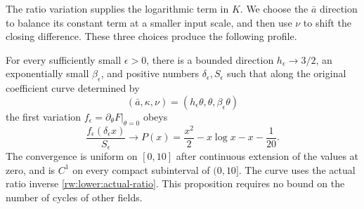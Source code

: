The ratio variation supplies the logarithmic term in $K$. We choose
the $\bar a$ direction to balance its constant term at a smaller input
scale, and then use $\nu$ to shift the closing difference. These three
choices produce the following profile.

\begin{proposition}\label{rw:lower-variation}
For every sufficiently small $\epsilon>0$, there is a bounded
direction $h_\epsilon\to3/2$, an exponentially small
$\beta_\epsilon$, and positive numbers $\delta_\epsilon,S_\epsilon$
such that along the original coefficient curve determined by
\[
 (\bar a,\kappa,\nu)=(h_\epsilon\theta,\theta,\beta_\epsilon\theta)
\]
the first variation $f_\epsilon=\partial_\theta F|_{\theta=0}$ obeys
\begin{equation}\label{rw:lower:profile-limit}
 \frac{f_\epsilon(\delta_\epsilon x)}{S_\epsilon}
 \longrightarrow
 P(x)=\frac{x^2}{2}-x\log x-x-\frac1{20}.
\end{equation}
The convergence is uniform on $[0,10]$ after continuous extension
of the values at zero, and is $C^1$ on every compact subinterval
of $(0,10]$. The curve uses the actual ratio inverse
\eqref{rw:lower:actual-ratio}. This proposition requires no bound on
the number of cycles of other fields.
\end{proposition}

